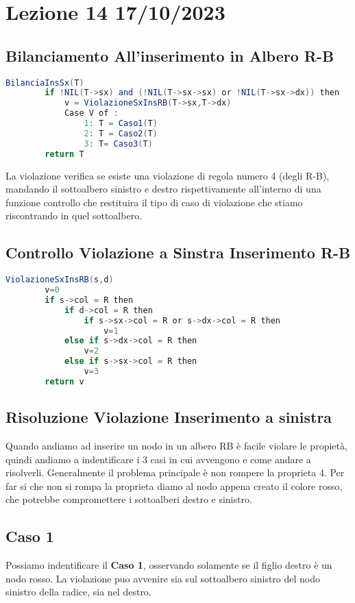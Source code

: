 \section{Lezione 14 17/10/2023}

\subsection{Bilanciamento All'inserimento in Albero R-B}

\begin{lstlisting}[language=Java]
	BilanciaInsSx(T)
		if !NIL(T->sx) and (!NIL(T->sx->sx) or !NIL(T->sx->dx)) then
			v = ViolazioneSxInsRB(T->sx,T->dx)
			Case V of :
				1: T = Caso1(T)
				2: T = Caso2(T)
				3: T= Caso3(T)
		return T
\end{lstlisting}

La violazione verifica se esiste una violazione di regola numero 4 (degli R-B), mandando il sottoalbero sinistro e destro rispettivamente all'interno di una funzione controllo che restituira il tipo di caso di violazione che stiamo riscontrando in quel sottoalbero.

\subsection{Controllo Violazione a Sinstra Inserimento R-B}

\begin{lstlisting}[language=Java]
	ViolazioneSxInsRB(s,d)
		v=0
		if s->col = R then
			if d->col = R then
				if s->sx->col = R or s->dx->col = R then
					v=1
			else if s->dx->col = R then
				v=2
			else if s->sx->col = R then
				v=3
		return v
\end{lstlisting}


\subsection{Risoluzione Violazione Inserimento a sinistra}
Quando andiamo ad inserire un nodo in un albero RB è facile violare le propietà, quindi andiamo a indentificare i 3 casi in cui avvengono e come andare a risolverli. Generalmente il problema principale è non rompere la proprieta 4. Per far si che non si rompa la proprieta diamo al nodo appena creato il colore rosso, che potrebbe compromettere i sottoalberi destro e sinistro.
\subsection{Caso 1}
Possiamo indentificare il \textbf{Caso 1}, osservando solamente se il figlio destro è un nodo rosso. La violazione puo avvenire sia sul sottoalbero sinistro del nodo sinistro della radice, sia nel destro.

